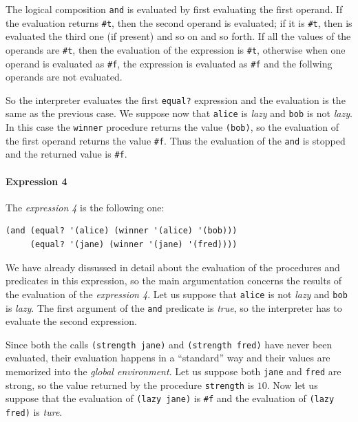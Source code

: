 \begin{itemize}
        The logical composition \texttt{and} is evaluated by first evaluating the first operand.
        If the evaluation returns \texttt{\#t}, then the second operand is evaluated; if it is \texttt{\#t}, then is evaluated the 
        third one (if present) and so on and so forth.
        If all the values of the operands are \texttt{\#t}, then the evaluation of the expression is \texttt{\#t}, otherwise when
        one operand is evaluated as \texttt{\#f}, the expression is evaluated as \texttt{\#f} and the follwing operands are not
        evaluated.
        
        So the interpreter evaluates the first \texttt{equal?} expression and the evaluation is the same as the previous case.
        We suppose now that \texttt{\textquotesingle alice} is \textit{lazy} and \texttt{\textquotesingle bob} is not \textit{lazy}.
        In this case the \texttt{winner} procedure returns the value \texttt{\textquotesingle (bob)}, so the evaluation of the first 
        operand returns the value \texttt{\#f}.
        Thus the evaluation of the \texttt{and} is stopped and the returned value is \texttt{\#f}.


        \paragraph*{Expression 4} The \textit{expression 4} is the following one: 
        \begin{lstlisting}
(and (equal? '(alice) (winner '(alice) '(bob)))
     (equal? '(jane) (winner '(jane) '(fred))))
        \end{lstlisting}

        We have already dissussed in detail about the evaluation of the procedures and predicates in this expression, so the main
        argumentation concerns the results of the evaluation of the \textit{expression 4}.
        Let us suppose that \texttt{\textquotesingle alice} is not \textit{lazy} and \texttt{\textquotesingle bob} is \textit{lazy}. 
        The first argument of the \texttt{and} predicate is \textit{true}, so the interpreter has to evaluate the second expression.
        
        Since both the calls \texttt{(strength \textquotesingle jane)} and \texttt{(strength \textquotesingle fred)} have never been evaluated, 
        their evaluation happens in a ``standard'' way and their values are memorized into the \textit{global environment}.
        Let us suppose both \texttt{\textquotesingle jane} and \texttt{\textquotesingle fred} are strong, so the value returned by the procedure \texttt{strength}
        is $10$. Now let us suppose that the evaluation of \texttt{(lazy \textquotesingle jane)} is \texttt{\#f} and the evaluation of 
        \texttt{(lazy \textquotesingle fred)} is \textit{ture}.


\end{itemize}
